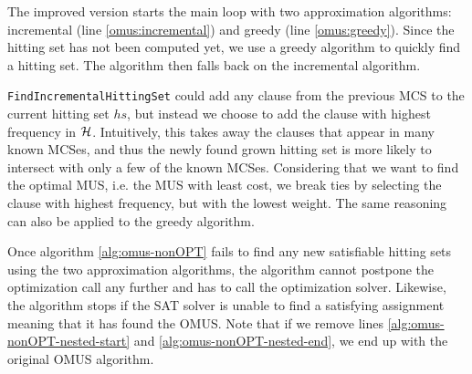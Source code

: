The improved version starts the main loop with two approximation algorithms: incremental (line \ref{omus:incremental}) and greedy (line \ref{omus:greedy}).
Since the hitting set has not been computed yet, we use a greedy algorithm to quickly find a hitting set.
The algorithm then falls back on the incremental algorithm.

\texttt{FindIncrementalHittingSet} could add any clause from the previous MCS to the current hitting set $hs$, but instead we choose to add the clause with highest frequency in $\mathcal{H}$.
Intuitively, this takes away the clauses that appear in many known MCSes, and thus the newly found grown hitting set is more likely to intersect with only a few of the known MCSes.
Considering that we want to find the optimal MUS, i.e. the MUS with least cost, we break ties by selecting the clause with highest frequency, but with the lowest weight.
The same reasoning can also be applied to the greedy algorithm.

Once algorithm \ref{alg:omus-nonOPT} fails to find any new satisfiable hitting sets using the two approximation algorithms, the algorithm cannot postpone the optimization call any further and has to call the optimization solver.
Likewise, the algorithm stops if the \textsc{SAT} solver is unable to find a satisfying assignment meaning that it has found the OMUS.
Note that if we remove lines \ref{alg:omus-nonOPT-nested-start} and \ref{alg:omus-nonOPT-nested-end}, we end up with the original \textsc{OMUS} algorithm.